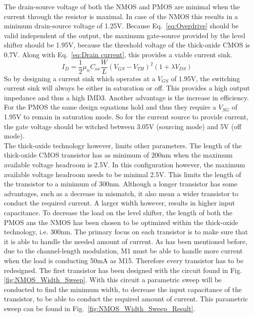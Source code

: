 The drain-source voltage of both the NMOS and PMOS are minimal when the current through the resistor is maximal. In case of the NMOS this results in a minimum drain-source voltage of 1.25V. Because Eq.~\ref{eq:Overdrive} should be valid independent of the output, the maximum gate-source provided by the level shifter should be 1.95V, because the threshold voltage of the thick-oxide CMOS is 0.7V. Along with Eq.~\ref{eq:Drain current}, this provides a viable current sink.
\begin{equation}{I_D = \frac{1}{2}\mu_n C_{ox}\frac{W}{L}(V_{GS}-V_{TH})^2(1+\lambda V_{DS})}\label{eq:Drain current}\end{equation}
So by designing a current sink which operates at a $V_{GS}$ of 1.95V, the switching current sink will always be either in saturation or off. This provides a high output impedance and thus a high IMD3. Another advantage is the increase in efficiency.\\
For the PMOS the same design equations hold and thus they require a $V_{SG}$ of 1.95V to remain in saturation mode. So for the current source to provide current, the gate voltage should be witched between 3.05V (sourcing mode) and 5V (off mode).\\ 
The thick-oxide technology however, limits other parameters. The length of the thick-oxide CMOS transistor has as minimum of 200nm when the maximum available voltage headroom is 2.5V. In this configuration however, the maximum available voltage headroom needs to be minimal 2.5V. This limits the length of the transistor to a minimum of 300nm. Although a longer transistor has some advantages, such as a decrease in mismatch, it also mean a wider transistor to conduct the required current. A larger width however, results in higher input capacitance. To decrease the load on the level shifter, the length of both the PMOS ans the NMOS has been chosen to be optimized within the thick-oxide technology, i.e. 300nm.
The primary focus on each transistor is to make sure that it is able to handle the needed amount of current. As has been mentioned before, due to the channel-length modulation, M1 must be able to handle more current when the load is conducting 50mA as M15. Therefore every transistor has to be redesigned. The first transistor has been designed with the circuit found in Fig.\ref{fig:NMOS_Width_Sweep}. With this circuit a parametric sweep will be conducted to find the minimum width, to decrease the input capacitance of the transistor, to be able to conduct the required amount of current. This parametric sweep can be found in Fig.~\ref{fig:NMOS_Width_Sweep_Result}.
